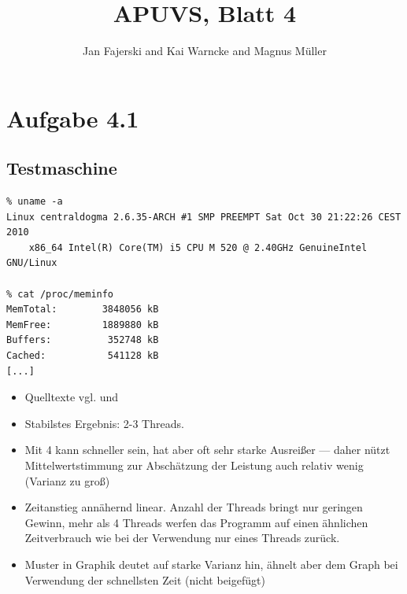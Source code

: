\documentclass[a4paper,
12pt,
BCOR12mm,
]{scrartcl}
\title{APUVS, Blatt 4}
\author{Jan Fajerski and Kai Warncke and Magnus Müller}
\begin{document}

\maketitle 

\section*{Aufgabe 4.1}
\subsection{Testmaschine}
\begin{verbatim}
% uname -a
Linux centraldogma 2.6.35-ARCH #1 SMP PREEMPT Sat Oct 30 21:22:26 CEST 2010
	x86_64 Intel(R) Core(TM) i5 CPU M 520 @ 2.40GHz GenuineIntel GNU/Linux

% cat /proc/meminfo
MemTotal:        3848056 kB
MemFree:         1889880 kB
Buffers:          352748 kB
Cached:           541128 kB
[...]
\end{verbatim}

\begin{itemize}
	\item Quelltexte vgl. \pageref{src:sum} und \pageref{src:ascend}
	\item Stabilstes Ergebnis: 2-3 Threads.
	\item Mit 4 kann schneller sein, hat aber oft sehr starke Ausreißer --- daher nützt
		Mittelwertstimmung zur Abschätzung der Leistung auch relativ wenig (Varianz zu groß)
	\item Zeitanstieg annähernd linear. Anzahl der Threads bringt nur geringen Gewinn, mehr
		als 4 Threads werfen das Programm auf einen ähnlichen Zeitverbrauch wie bei der
		Verwendung nur eines Threads zurück.
	\item Muster in Graphik deutet auf starke Varianz hin, ähnelt aber dem Graph bei
		Verwendung der schnellsten Zeit (nicht beigefügt)
\end{itemize}
\end{document}
